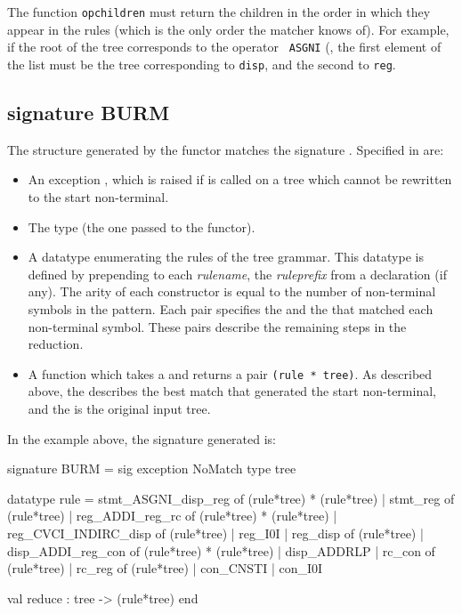 \documentclass[11pt]{article}
\begin{document}
The function {\tt opchildren} must return the children in the order in
which they appear in the rules (which is the only order the matcher knows
of).  For example, if the root of the tree corresponds to the operator {\tt
ASGNI} (, the first element of the list
must be the tree corresponding to {\tt disp}, and the second 
to {\tt reg}.



	\subsection{signature BURM}

The structure generated by the functor  matches the
signature . Specified in  are:

\begin{itemize}
 	\item An exception , which is raised if  is
called on a tree which cannot be rewritten to the start non-terminal.

 	\item The type  (the one passed to the functor).

 	\item A datatype  enumerating the rules of the tree
grammar. This datatype is defined by prepending to each {\sl rulename},
the {\sl ruleprefix} from a  declaration (if any).
The arity of each constructor is equal to the number of non-terminal
symbols in the pattern. Each  pair specifies the
 and the  that matched each non-terminal symbol.
These pairs describe the remaining steps in the reduction. 

	 \item A function  which takes a  and
returns a pair \verb|(rule * tree)|. As described above, the 
describes the best match that generated the start non-terminal, and the
 is the original input tree.
\end{itemize}

In the example above, the signature  generated is:

\begin{centercode}
signature BURM = sig
  exception NoMatch
  type tree

  datatype rule = 
       stmt_ASGNI_disp_reg  of (rule*tree) * (rule*tree)
     | stmt_reg             of (rule*tree)
     | reg_ADDI_reg_rc      of (rule*tree) * (rule*tree)
     | reg_CVCI_INDIRC_disp of (rule*tree)
     | reg_I0I
     | reg_disp             of (rule*tree)
     | disp_ADDI_reg_con    of (rule*tree) * (rule*tree)
     | disp_ADDRLP
     | rc_con               of (rule*tree)
     | rc_reg               of (rule*tree)
     | con_CNSTI
     | con_I0I

  val reduce : tree -> (rule*tree)
end
\end{centercode}
\end{document}
